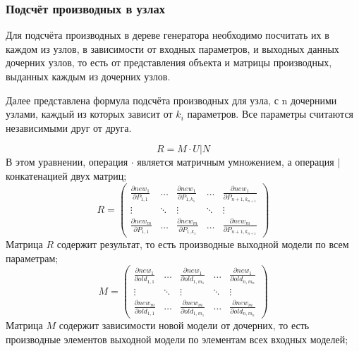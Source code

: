 \documentclass[a4paper,hidelinks,12pt]{article}
\begin{document}
\subsubsection{Подсчёт производных в узлах}
Для подсчёта производных в дереве генератора необходимо посчитать их в каждом из узлов, в зависимости от входных параметров, и выходных данных дочерних узлов, то есть от представления объекта и матрицы производных, выданных каждым из дочерних узлов.
\par
Далее представлена формула подсчёта производных для узла, с n дочерними узлами, каждый из которых зависит от $k_i$ параметров. Все параметры считаются независимыми друг от друга.
\par
$$R = M \cdot U | N$$
В этом уравнении, операция $\cdot$ является матричным умножением, а операция $|$ конкатенацией двух матриц;
\begin{equation*}
R = \left(
\begin{array}{ccccc}
\frac{\partial new_1} {\partial P_{1,1}} & \ldots & \frac{\partial new_1} {\partial P_{1,k_1}} & \ldots & \frac{\partial new_1} {\partial P_{n+1,k_{n+1}}}\\
\vdots & \ddots & \vdots & \ddots & \vdots\\
\frac{\partial new_m} {\partial P_{1,1}} & \ldots & \frac{\partial new_m} {\partial P_{1,k_1}} & \ldots & \frac{\partial new_m} {\partial P_{n+1,k_{n+1}}}
\end{array}
\right)
\end{equation*}
Матрица $R$ содержит результат, то есть производные выходной модели по всем параметрам;
\begin{equation*}
M = \left(
\begin{array}{ccccc}
\frac{\partial new_1} {\partial old_{1,1}} & \ldots & \frac{\partial new_1} {\partial old_{1,m_1}} & \ldots & \frac{\partial new_1} {\partial old_{n,m_n}}\\
\vdots & \ddots & \vdots & \ddots & \vdots\\
\frac{\partial new_m} {\partial old_{1,1}} & \ldots & \frac{\partial new_m} {\partial old_{1,m_1}} & \ldots & \frac{\partial new_m} {\partial old_{n,m_n}}
\end{array}
\right)
\end{equation*}
Матрица $M$ содержит зависимости новой модели от дочерних, то есть производные элементов выходной модели по элементам всех входных моделей;
\end{document}
